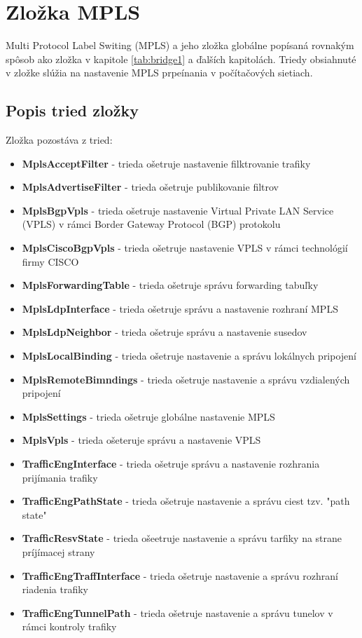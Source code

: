 \section{Zložka MPLS}
Multi Protocol Label Switing (MPLS) a jeho zložka globálne popísaná rovnakým spôsob ako zložka v kapitole \ref{tab:bridge1} a ďalších kapitolách. Triedy obsiahnuté v zložke slúžia na nastavenie MPLS prpeínania v počítačových sietiach.
\subsection{Popis tried zložky}
Zložka pozostáva z tried:
\begin{itemize}
\item \textbf{MplsAcceptFilter} - trieda ošetruje nastavenie  filktrovanie trafiky
\item \textbf{MplsAdvertiseFilter} - trieda ošetruje publikovanie filtrov
\item \textbf{MplsBgpVpls} - trieda ošetruje nastavenie Virtual Private LAN Service (VPLS) v rámci  Border Gateway Protocol (BGP) protokolu
\item \textbf{MplsCiscoBgpVpls} - trieda ošetruje nastavenie VPLS v rámci technológií firmy CISCO
\item \textbf{MplsForwardingTable} - trieda ošetruje správu forwarding tabuľky
\item \textbf{MplsLdpInterface} - trieda ošetruje správu a nastavenie rozhraní MPLS
\item \textbf{MplsLdpNeighbor} - trieda ošetruje správu a nastavenie susedov
\item \textbf{MplsLocalBinding} - trieda ošetruje nastavenie  a správu lokálnych pripojení
\item \textbf{MplsRemoteBimndings} - trieda ošetruje nastavenie a správu vzdialených pripojení
\item \textbf{MplsSettings} - trieda ošetruje globálne nastavenie MPLS
\item \textbf{MplsVpls} - trieda ošeteruje správu a nastavenie VPLS
\item \textbf{TrafficEngInterface} - trieda ošetruje správu a nastavenie rozhrania prijímania trafiky
\item \textbf{TrafficEngPathState} - trieda ošetruje nastavenie a správu ciest tzv. "path state"
\item \textbf{TrafficResvState} - trieda ošeetruje nastavenie a správu tarfiky na strane príjímacej strany
\item \textbf{TrafficEngTraffInterface} - trieda ošetruje nastavenie a správu rozhraní riadenia trafiky
\item \textbf{TrafficEngTunnelPath} - trieda ošetruje nastavenie  a správu tunelov v rámci kontroly trafiky
\end{itemize}
